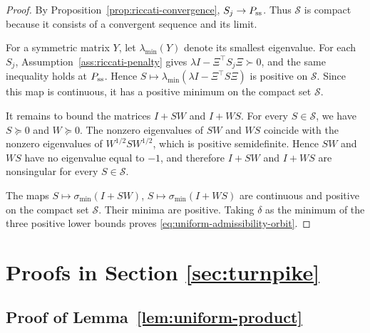 \documentclass[10pt,journal,twoside]{IEEEtran}
\theoremstyle{definition}
\theoremstyle{remark}
\begin{document}
\begin{proof}
	By Proposition~\ref{prop:riccati-convergence}, \(S_j\to P_{\rm ss}\).
	Thus \(\mathscr S\) is compact because it consists of a convergent
	sequence and its limit.
	
	For a symmetric matrix \(Y\), let \(\lambda_{\min}(Y)\) denote its smallest eigenvalue. For each \(S_j\),  Assumption~\ref{ass:riccati-penalty} gives \(\lambda I-\Xi^\top S_j\Xi\succ0\), and the same inequality holds at \(P_{\rm ss}\). Hence
	\(
	S\mapsto
	\lambda_{\min}(\lambda I-\Xi^\top S\Xi)
	\)
	is positive on \(\mathscr S\). Since this map is continuous,  it has a positive minimum on the compact set \(\mathscr S\).
	
	It remains to bound the matrices \(I+SW\) and \(I+WS\). For every
	\(S\in\mathscr S\), we have \(S\succeq0\) and \(W\succeq0\). The
	nonzero eigenvalues of \(SW\) and \(WS\) coincide with the nonzero
	eigenvalues of \(W^{1/2}SW^{1/2}\), which is positive semidefinite.
	Hence \(SW\) and \(WS\) have no eigenvalue equal to \(-1\), and
	therefore \(I+SW\) and \(I+WS\) are nonsingular for every
	\(S\in\mathscr S\).
	
	The maps $S\mapsto \sigma_{\min}(I+SW)$,
	$S\mapsto \sigma_{\min}(I+WS)$
	are continuous and positive on the compact set \(\mathscr S\). Their
	minima are positive. Taking \(\delta\) as the minimum of the three
	positive lower bounds proves \eqref{eq:uniform-admissibility-orbit}.
\end{proof}







\section{Proofs in Section \ref{sec:turnpike}}


\subsection{Proof of Lemma~\ref{lem:uniform-product}}
\label{app:lem4}
\end{document}
